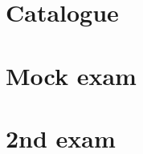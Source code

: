 \documentclass{article}
\author{Leopold Lemmermann}
\begin{document}
\createtitle

\section{Catalogue}




\section[2024]{Mock exam}




\section[2023]{2nd exam}

















\end{document}
